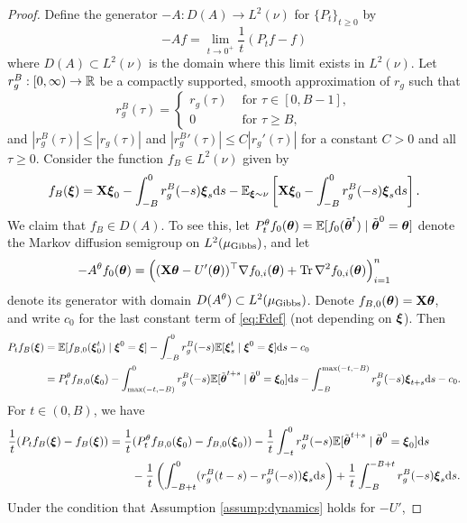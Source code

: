 \begin{proof}
Define the generator $-A:D(A) \to L^2(\nu)$ for $\{P_t\}_{t \geq 0}$ by
\[-Af=\lim_{t \to 0^+} \frac{1}{t}(P_tf-f)\]
where $D(A) \subset L^2(\nu)$ is the domain where this limit exists in
$L^2(\nu)$. Let $r_g^B:[0,\infty) \to \mathbb{R}$ be a compactly supported,
smooth approximation of $r_g$ such that
\[r_g^B(\tau)=\begin{cases}r_g(\tau) & \text{ for } \tau \in [0,B-1],\\
0 & \text{ for } \tau \geq B,\end{cases}\]
and $|r_g^B(\tau)| \leq |r_g(\tau)|$ 
and $|{r_g^B}'(\tau)| \leq C|r_g'(\tau)|$  for a constant $C>0$ and
all $\tau \geq 0$. Consider the function $f_B \in L^2(\nu)$ given by
\begin{equation}\label{eq:Fdef}
f_B(\boldsymbol{\xi})=\mathbf{X}\boldsymbol{\xi}_0-\int_{-B}^0 r_g^B(-s)\boldsymbol{\xi}_s \mathrm{d} s
-\mathbb{E}_{\boldsymbol{\xi} \sim \nu}\left[\mathbf{X}\boldsymbol{\xi}_0-\int_{-B}^0 r^B_g(-s)\boldsymbol{\xi}_s \mathrm{d} s\right].
\end{equation} 
We claim that $f_B \in D(A)$. To see this, let
$P_t^\theta f_0(\boldsymbol{\theta})=\mathbb{E}[f_0(\tilde {\boldsymbol{\theta}}^t) \mid \tilde {\boldsymbol{\theta}}^0=\boldsymbol{\theta}]$ denote the Markov diffusion semigroup on $L^2(\mu_{\mathrm{Gibbs}})$,
and let
\begin{equation}\label{eq:diffusiongenerator}
-A^\theta f_0(\boldsymbol{\theta})=\Big((\mathbf{X}\boldsymbol{\theta}-U'(\boldsymbol{\theta}))^\top \nabla f_{0,i}(\boldsymbol{\theta})
+\operatorname{Tr} \nabla^2 f_{0,i}(\boldsymbol{\theta})\Big)_{i=1}^n
\end{equation}
denote its generator with domain $D(A^\theta) \subset
L^2(\mu_{\mathrm{Gibbs}})$. Denote $f_{B,0}(\boldsymbol{\theta})=\mathbf{X}\boldsymbol{\theta}$, and write $c_0$ for the
last constant term of \eqref{eq:Fdef} (not depending on $\boldsymbol{\xi}$). Then
\begin{align*}
P_tf_B(\boldsymbol{\xi})&=\mathbb{E}[f_{B,0}(\boldsymbol{\xi}_0^t) \mid \boldsymbol{\xi}^0=\boldsymbol{\xi}]
-\int_{-B}^0 r_g^B({-}s)\mathbb{E}[\boldsymbol{\xi}_s^t \mid \boldsymbol{\xi}^0=\boldsymbol{\xi}]\mathrm{d} s-c_0\\
&=P_t^\theta f_{B,0}(\boldsymbol{\xi}_0)
-\int_{\max(-t,-B)}^0 r_g^B({-}s)\mathbb{E}[\tilde {\boldsymbol{\theta}}^{t+s} \mid
\tilde{\boldsymbol{\theta}}^0=\boldsymbol{\xi}_0]\mathrm{d} s-\int_{-B}^{\max(-t,-B)} r_g^B({-}s)\boldsymbol{\xi}_{t+s}\mathrm{d}
s-c_0.
\end{align*}
For $t \in (0,B)$, we have
\begin{align*}
\frac{1}{t}(P_tf_B(\boldsymbol{\xi})-f_B(\boldsymbol{\xi}))
&=\frac{1}{t}(P_t^\theta f_{B,0}(\boldsymbol{\xi}_0)-f_{B,0}(\boldsymbol{\xi}_0))
-\frac{1}{t}\int_{-t}^0 r_g^B({-}s)\mathbb{E}[\tilde {\boldsymbol{\theta}}^{t+s} \mid \tilde {\boldsymbol{\theta}}^0
=\boldsymbol{\xi}_0]\mathrm{d} s\\
&\qquad-\frac{1}{t}\left(\int_{-B+t}^0 (r_g^B(t-s)-r_g^B({-}s))\boldsymbol{\xi}_s\mathrm{d} s\right)
+\frac{1}{t}\int_{-B}^{-B+t} r_g^B({-}s)\boldsymbol{\xi}_s \mathrm{d} s.
\end{align*}
Under the condition that Assumption \ref{assump:dynamics} holds for ${-}U'$,

\end{proof}
